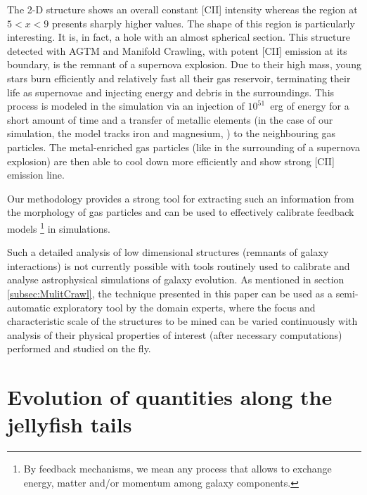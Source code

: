 The 2-D structure shows an overall constant [CII] intensity whereas the region at $5 < x < 9$ presents sharply higher values.
The shape of this region is particularly interesting. It is, in fact, a hole with an almost spherical section. This structure detected with AGTM and Manifold Crawling, with potent [CII] emission at its boundary, is the remnant of a supernova explosion. Due to their high mass, young stars burn efficiently and relatively fast all their gas reservoir, terminating their life as supernovae and injecting energy and debris in the surroundings.
This process is modeled in the simulation via an injection of $10^{51}$~erg of energy for a short amount of time and a transfer of metallic elements (in the case of our simulation, the model tracks iron and magnesium, \cite{DeRijcke2013}) to the neighbouring gas particles. The metal-enriched gas particles (like in the surrounding of a supernova explosion) are then able to cool down more efficiently and show strong [CII] emission line.

Our methodology provides a strong tool for extracting such an information from the morphology of gas particles and can be used to effectively calibrate feedback models \footnote{By feedback mechanisms, we mean any process that allows to exchange energy, matter and/or momentum among galaxy components.} in simulations.

Such a detailed analysis of low dimensional structures (remnants of galaxy interactions) is not currently possible with tools routinely used to calibrate and analyse astrophysical simulations of galaxy evolution.
As mentioned in section \ref{subsec:MulitCrawl}, the technique presented in this paper can be used as a semi-automatic exploratory tool by the domain experts, where the focus and characteristic scale of the structures to be mined can be varied continuously with analysis of their physical properties of interest (after necessary computations) performed and studied on the fly.

\section{Evolution of quantities along the jellyfish tails}

